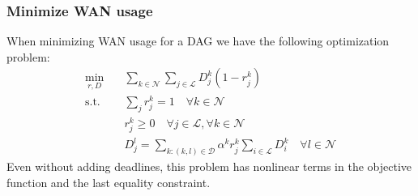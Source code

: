 \subsubsection*{Minimize WAN usage}

When minimizing WAN usage for a DAG we have the following optimization problem:
\begin{subequations}
	\begin{align}
		\min_{r,D} \quad & \sum_{k\in\mathcal{N}}\sum_{j\in\mathcal{L}}D_j^k(1-r_j^k) \\
		\text{s.t.} \quad & \sum_{j}r_j^k = 1 \quad \forall k\in\mathcal{N}\\
		& r_j^k \geq 0 \quad \forall j\in\mathcal{L},\forall k\in\mathcal{N} \\
		& D_j^l = \sum_{k:(k,l)\in\mathcal{D}}\alpha^kr_j^k\sum_{i\in\mathcal{L}}D_i^k \quad \forall l\in\mathcal{N}
	\end{align}
\end{subequations}
Even without adding deadlines, this problem has nonlinear terms in the objective function and the last equality constraint.